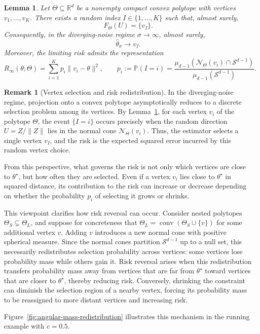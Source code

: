 \documentclass[11pt]{article}
\theoremstyle{plain}
\newtheorem{lemma}[theorem]{Lemma}
\theoremstyle{definition}
\newtheorem*{remark}{Remark}
\providecommand{\mathbbm}{\mathbb} %
\newcommand{\R}{\mathbbm{R}}
\renewcommand{\P}{\mathbb{P}}
\newcommand{\hattheta}{\hat{\theta}}
\newcommand{\mcN}{\mathcal{N}}
\newcommand{\mcS}{\mathcal{S}}
\begin{document}
\begin{lemma}\label{lem:polytopeMaxAtVertex}
Let $\Theta \subseteq \R^d$ be a nonempty compact convex polytope with vertices
$v_1,\dots,v_K$. There exists a random index $I \in \{1,\dots,K\}$ such that,
almost surely,
\[
F_\Theta(U) = \{v_I\}.
\]
Consequently, in the diverging-noise regime $\sigma\to\infty$, almost surely,
\[
\hattheta_\sigma \to v_I.
\]
Moreover, the limiting risk admits the representation
\[
R_\infty(\theta; \Theta)
=
\sum_{i=1}^K p_i  \|v_i-\theta\|^2,
\qquad
p_i := \P(I=i)
=
\frac{\mu_{d-1}(\mcN_\Theta(v_i)\cap \mathcal S^{d-1})}
{\mu_{d-1}(\mathcal S^{d-1})}.
\]
\end{lemma}

\begin{remark}[Vertex selection and risk redistribution]
In the diverging-noise regime, projection onto a convex polytope asymptotically reduces to a discrete selection problem among its vertices. By Lemma~\ref{lem:polytopeMaxAtVertex}, for each vertex $v_i$ of the polytope $\Theta$, the event $\{I=i\}$ occurs precisely when the random direction $U=Z/\|Z\|$ lies in the normal cone $\mcN_\Theta(v_i)$. Thus, the estimator selects a single vertex $v_I$, and the risk is the expected squared error incurred by this random vertex choice.

From this perspective, what governs the risk is not only which vertices are close to $\theta^\star$, but how often they are selected. Even if a vertex $v_i$ lies close to $\theta^\star$ in squared distance, its contribution to the risk can increase or decrease depending on whether the probability $p_i$ of selecting it grows or shrinks.

This viewpoint clarifies how risk reversal can occur. Consider nested polytopes
$\Theta_S\subsetneq\Theta_L$, and suppose for concreteness that $\Theta_L=\operatorname{conv}(\Theta_S\cup\{v\})$ for some additional vertex $v$. Adding $v$ introduces a new normal cone with positive spherical measure. Since the normal cones partition $\mcS^{d-1}$ up to a null set, this necessarily redistributes selection probability across vertices: some vertices lose probability mass while others gain it. Risk reversal arises when this redistribution transfers probability mass away from vertices that are far from $\theta^\star$ toward vertices that are closer to $\theta^\star$, thereby reducing risk. Conversely, shrinking the constraint can diminish the selection region of a nearby vertex, forcing its probability mass to be reassigned to more distant vertices and increasing risk.

Figure~\ref{fig:angular-mass-redistribution} illustrates this mechanism in the running example with $c=0.5$.
\end{remark}
\end{document}
